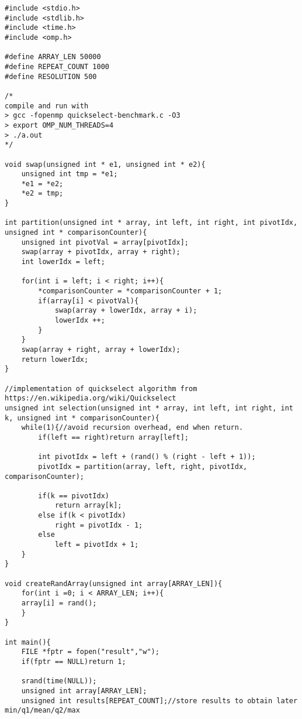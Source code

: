 \documentclass[11pt]{article}
\begin{document}
\begin{lstlisting}
#include <stdio.h> 
#include <stdlib.h>
#include <time.h>
#include <omp.h>

#define ARRAY_LEN 50000
#define REPEAT_COUNT 1000
#define RESOLUTION 500

/*
compile and run with
> gcc -fopenmp quickselect-benchmark.c -O3
> export OMP_NUM_THREADS=4
> ./a.out
*/

void swap(unsigned int * e1, unsigned int * e2){
    unsigned int tmp = *e1;
    *e1 = *e2;
    *e2 = tmp;
}

int partition(unsigned int * array, int left, int right, int pivotIdx, unsigned int * comparisonCounter){
    unsigned int pivotVal = array[pivotIdx];
    swap(array + pivotIdx, array + right);
    int lowerIdx = left;
    
    for(int i = left; i < right; i++){
        *comparisonCounter = *comparisonCounter + 1;
        if(array[i] < pivotVal){
            swap(array + lowerIdx, array + i);
            lowerIdx ++;
        }
    }
    swap(array + right, array + lowerIdx);
    return lowerIdx;
}

//implementation of quickselect algorithm from https://en.wikipedia.org/wiki/Quickselect
unsigned int selection(unsigned int * array, int left, int right, int k, unsigned int * comparisonCounter){
    while(1){//avoid recursion overhead, end when return.
        if(left == right)return array[left];
        
        int pivotIdx = left + (rand() % (right - left + 1));
        pivotIdx = partition(array, left, right, pivotIdx, comparisonCounter);
        
        if(k == pivotIdx)
            return array[k];
        else if(k < pivotIdx)
            right = pivotIdx - 1;
        else
            left = pivotIdx + 1;
    }
}

void createRandArray(unsigned int array[ARRAY_LEN]){
    for(int i =0; i < ARRAY_LEN; i++){
    array[i] = rand();
    }
}
        
int main(){
    FILE *fptr = fopen("result","w");
    if(fptr == NULL)return 1;
    
    srand(time(NULL));
    unsigned int array[ARRAY_LEN];
    unsigned int results[REPEAT_COUNT];//store results to obtain later min/q1/mean/q2/max
    

\end{lstlisting}
\end{document}
